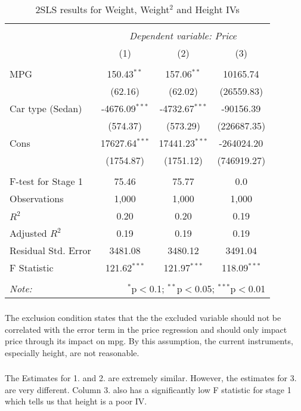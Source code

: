 \documentclass{article}
\begin{document}
\begin{table}[!ht] \centering
\begin{tabular}{@{\extracolsep{5pt}}lccc}
\\[-1.8ex]\hline
\hline \\[-1.8ex]
& \multicolumn{3}{c}{\textit{Dependent variable: Price}} \
\cr \cline{1-4}
\\[-1.8ex] & (1) & (2) & (3) \\
\hline \\[-1.8ex]
 MPG & 150.43$^{**}$ & 157.06$^{**}$ & 10165.74$^{}$ \\
  & (62.16) & (62.02) & (26559.83) \\
 Car type (Sedan) & -4676.09$^{***}$ & -4732.67$^{***}$ & -90156.39$^{}$ \\
  & (574.37) & (573.29) & (226687.35) \\
 Cons & 17627.64$^{***}$ & 17441.23$^{***}$ & -264024.20$^{}$ \\
  & (1754.87) & (1751.12) & (746919.27) \\
\hline \\[-1.8ex]
 F-test for Stage 1 & 75.46 & 75.77 & 0.0 \\
 Observations & 1,000 & 1,000 & 1,000 \\
 $R^2$ & 0.20 & 0.20 & 0.19 \\
 Adjusted $R^2$ & 0.19 & 0.19 & 0.19 \\
 Residual Std. Error & 3481.08 & 3480.12 & 3491.04  \\
 F Statistic & 121.62$^{***}$  & 121.97$^{***}$  & 118.09$^{***}$  \\
\hline
\hline \\[-1.8ex]
\textit{Note:} & \multicolumn{3}{r}{$^{*}$p$<$0.1; $^{**}$p$<$0.05; $^{***}$p$<$0.01} \\
\end{tabular}
\caption{2SLS results for Weight, Weight$^2$ and Height IVs}
\end{table}

\subsubsection{}
The exclusion condition states that the the excluded variable should not be correlated with the error term in the price regression and should only impact price through its impact on mpg. By this assumption, the current instruments, especially height, are not reasonable. 

\subsubsection{}
The Estimates for 1. and 2. are extremely similar. However, the estimates for 3. are very different. Column 3. also has a significantly low F statistic for stage 1 which tells us that height is a poor IV. 
\end{document}
